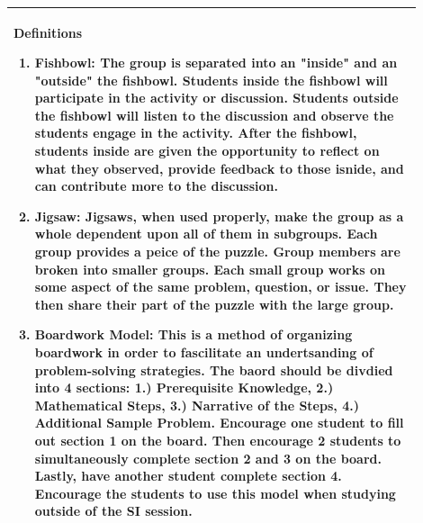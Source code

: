 \documentclass{article}
\begin{document}
\vspace{0.5cm}
\noindent
\begin{tabular}{|p{0.9\linewidth}|}
\hline
{\large \textbf{Definitions}}
\begin{enumerate}
    \item \textbf{Fishbowl:} The group is separated into an "inside" and an "outside" the fishbowl. Students inside the fishbowl will participate in the activity or discussion. Students outside the fishbowl will listen to the discussion and observe the students engage in the activity. After the fishbowl, students inside are given the opportunity to reflect on what they observed, provide feedback to those isnide, and can contribute more to the discussion.
    \item \textbf{Jigsaw:} Jigsaws, when used properly, make the group as a whole dependent upon all of them in subgroups. Each group provides a peice of the puzzle. Group members are broken into smaller groups. Each small group works on some aspect of the same problem, question, or issue. They then share their part of the puzzle with the large group.
    \item \textbf{Boardwork Model:} This is a method of organizing boardwork in order to fascilitate an undertsanding of problem-solving strategies. The baord should be divdied into 4 sections: 1.) Prerequisite Knowledge, 2.) Mathematical Steps, 3.) Narrative of the Steps, 4.) Additional Sample Problem. Encourage one student to fill out section 1 on the board. Then encourage 2 students to simultaneously complete section 2 and 3 on the board. Lastly, have another student complete section 4. Encourage the students to use this model when studying outside of the SI session.
\end{enumerate}
\\ \hline
\end{tabular}
\item \vspace{0.2cm}
\newpage
\end{document}
